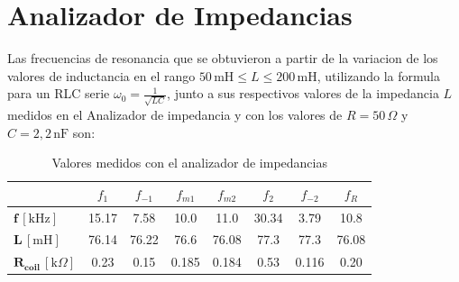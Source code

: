 \section{Analizador de Impedancias}

Las frecuencias de resonancia que se obtuvieron a partir de la variacion de los valores de inductancia en el rango $50\,\text{mH} \leq L \leq 200\,\text{mH}$, utilizando la formula para un RLC serie $\omega_0=\frac{1}{\sqrt{LC}}$, junto a sus respectivos valores de la impedancia $L$ medidos en el Analizador de impedancia y con los valores de $R = 50\,\Omega$ y $C = 2{,}2\,\text{nF}$ son:

\begin{table}[H]
\centering
\caption{Valores medidos con el analizador de impedancias}
\label{tab:impedancias_tp4_traspuesta}
\begin{tabular}{lccccccc}
\toprule
\textbf{} & $f_{1}$ & $f_{-1}$ & $f_{m1}$ & $f_{m2}$ & $f_{2}$ & $f_{-2}$ & $f_{R}$ \\
\midrule
$\boldsymbol{f}\,[\text{kHz}]$        & 15.17 & 7.58 & 10.0 & 11.0 & 30.34 & 3.79 & 10.8 \\
$\boldsymbol{L}\,[\text{mH}]$      & 76.14 & 76.22 & 76.6 & 76.08 & 77.3 & 77.3 & 76.08 \\
$\boldsymbol{R}_{\boldsymbol{coil}}\,[\text{k}\Omega]$ & 0.23 & 0.15 & 0.185 & 0.184 & 0.53 & 0.116 & 0.20 \\
\bottomrule
\end{tabular}
\end{table}
\newpage